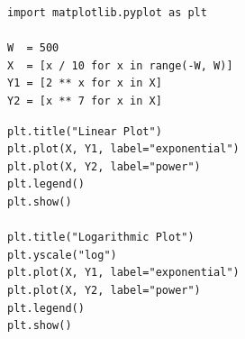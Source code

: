 \begin{codebox}
\begin{verbatim}
import matplotlib.pyplot as plt

W  = 500
X  = [x / 10 for x in range(-W, W)]
Y1 = [2 ** x for x in X]
Y2 = [x ** 7 for x in X]
\end{verbatim}
\end{codebox}
%
\begin{codebox}[]
\begin{verbatim}
plt.title("Linear Plot")
plt.plot(X, Y1, label="exponential")
plt.plot(X, Y2, label="power")
plt.legend()
plt.show()

plt.title("Logarithmic Plot")
plt.yscale("log")
plt.plot(X, Y1, label="exponential")
plt.plot(X, Y2, label="power")
plt.legend()
plt.show()
\end{verbatim}
\end{codebox}

